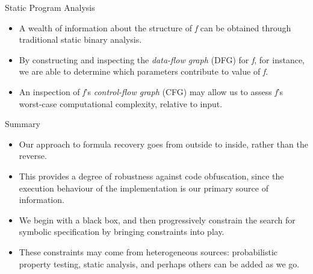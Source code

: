 \documentclass[presentation]{beamer}
\begin{document}
\begin{frame}[label={sec:org80327d4}]{Static Program Analysis}
\begin{itemize}
\item A wealth of information about the structure of \emph{f} can be obtained through traditional static binary analysis.
\item By constructing and inspecting the \emph{data-flow graph} (DFG) for \emph{f}, for instance, we are able to determine which parameters contribute to value of \emph{f}.
\item An inspection of \emph{f}'s \emph{control-flow graph} (CFG) may allow us to assess \emph{f}'s worst-case computational complexity, relative to input.
\end{itemize}
\end{frame}

\begin{frame}[label={sec:org624c78c}]{Summary}
\begin{itemize}
\item Our approach to formula recovery goes from \alert{outside} to \alert{inside}, rather than the reverse.
\item This provides a degree of robustness against code obfuscation, since the \alert{execution behaviour} of the implementation is our primary source of information.
\item We begin with a black box, and then progressively \alert{constrain} the search for symbolic specification by bringing constraints into play.
\item These constraints may come from \alert{heterogeneous} sources: probabilistic property testing, static analysis, and perhaps others can be added as we go.
\end{itemize}
\end{frame}
\end{document}

